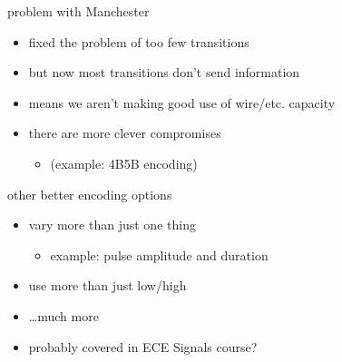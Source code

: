 \begin{frame}{problem with Manchester}
    \begin{itemize}
    \item fixed the problem of too few transitions
    \vspace{.5cm}
    \item but now most transitions don't send information
    \item means we aren't making good use of wire/etc. capacity
    \vspace{.5cm}
    \item there are more clever compromises
        \begin{itemize}
        \item (example: 4B5B encoding)
        \end{itemize}
    \end{itemize}
\end{frame}

\begin{frame}{other better encoding options}
    \begin{itemize}
    \item vary more than just one thing
        \begin{itemize}
        \item example: pulse amplitude and duration
        \end{itemize}
    \item use more than just low/high
    \item \ldots much more
    \vspace{.5cm}
    \item probably covered in ECE Signals course?
    \end{itemize}
\end{frame}

